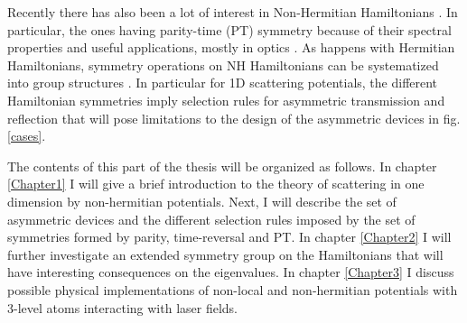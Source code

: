 Recently there has also been a lot of interest in Non-Hermitian Hamiltonians \cite{Nixon2016,Nixon2016a,Chen2017,Ruschhaupt2017,Simon2018,Simon2019a,Alana2020,Bernard2002,Kawabata2019}. In particular, the ones having parity-time (PT) symmetry \cite{Bender1998,Znojil2015} because of their spectral properties and useful applications, mostly in optics  \cite{Longhi2017a,Konotop2016,Longhi2014}. As happens with Hermitian Hamiltonians, symmetry operations on NH Hamiltonians can be systematized into group structures \cite{Ruschhaupt2017,Simon2019a,Alana2020}. In particular for
1D scattering potentials, the different Hamiltonian symmetries imply
selection rules for asymmetric transmission and reflection \cite{Ruschhaupt2017,Simon2019a} that will pose limitations to the design of the asymmetric devices in fig. \ref{cases}.
%

The contents of this part of the thesis will be organized as follows. In chapter \ref{Chapter1} I will give a brief introduction to the theory of scattering in one dimension by non-hermitian potentials. Next, I will describe the set of asymmetric devices and the different selection rules imposed by the set of symmetries formed by parity, time-reversal and PT. In chapter \ref{Chapter2} I will further investigate an extended symmetry group on the Hamiltonians that will have interesting consequences on the eigenvalues. In chapter \ref{Chapter3} I discuss possible physical implementations of non-local and non-hermitian potentials with 3-level atoms interacting with laser fields.
